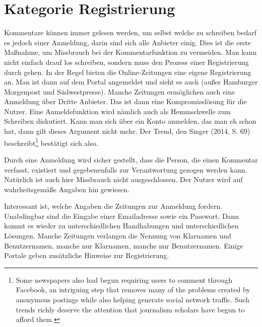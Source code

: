 

\section{Kategorie Registrierung}

Kommentare können immer gelesen werden, um selbst welche zu schreiben bedarf es
jedoch einer Anmeldung, darin sind sich alle Anbieter einig. Dies ist die erste
Maßnahme, um Missbrauch bei der Kommentarfunktion zu vermeiden. Man kann nicht
einfach drauf los schreiben, sondern muss den Prozess einer Registrierung durch
gehen. In der Regel bieten die Online-Zeitungen eine eigene Registrierung an.
Man ist dann auf dem Portal angemeldet und sieht es auch (außer Hamburger
Morgenpost und Südwestpresse). Manche Zeitungen ermöglichen auch eine Anmeldung
über Dritte Anbieter. Das ist dann eine Kompromisslösung für die Nutzer. Eine
Anmeldefunktion wird nämlich auch als Hemmschwelle zum Schreiben diskutiert.
Kann man sich über ein Konto anmelden, das man eh schon hat, dann gilt dieses
Argument nicht mehr. Der Trend, den Singer (2014, S. 69)
beschreibt\footnote{\glqq Some newspapers also had begun requiring users to
comment through Facebook, an intriguing step that removes many of the problems
created by anonymous postings while also helping generate social network
traffic. Such trends richly deserve the attention that journalism scholars have
begun to afford them.\grqq} bestätigt sich also.

Durch eine Anmeldung wird sicher gestellt, dass die Person, die einen Kommentar
verfasst, existiert und gegebenenfalls zur Verantwortung gezogen werden kann.
Natürlich ist auch hier Missbrauch nicht ausgeschlossen. Der Nutzer wird auf
wahrheitsgemäße Angaben hin gewiesen. 

Interessant ist, welche Angaben die Zeitungen zur Anmeldung fordern. Unabdingbar
sind die Eingabe einer Emailadresse sowie ein Passwort. Dann kommt es wieder zu
unterschiedlichen Handhabungen und unterschiedlichen Lösungen. Manche Zeitungen
verlangen die Nennung von Klarnamen und Benutzernamen, manche nur Klarnamen,
manche nur Benutzernamen. Einige Portale geben zusätzliche Hinweise zur
Registrierung. 


